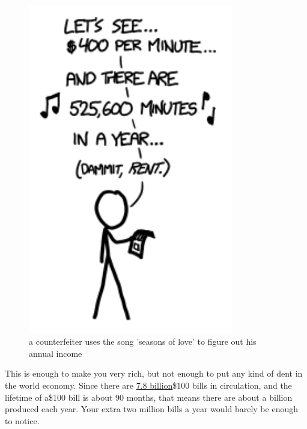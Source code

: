 \begin{figure}[!htbp]
\centering
\includegraphics[scale=0.5, max width=0.8\textwidth]{imgs/a/23/short_rent.png}
\caption{a counterfeiter uses the song 'seasons of love' to figure out his annual income}
\end{figure}

{This is enough to make you very rich, but not enough to put any kind of dent in the world economy. Since there are \href{http://www.federalreserve.gov/paymentsystems/coin\_currcircvolume.htm}{7.8 billion}\$100 bills in circulation, and the lifetime of a\$100 bill is about 90 months, that means there are about a billion produced each year. Your extra two million bills a year would barely be enough to notice.}


\hfill{}

